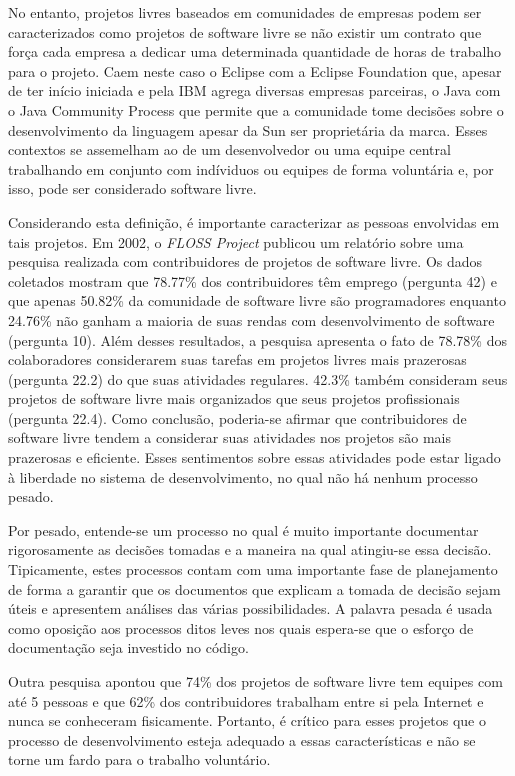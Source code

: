 No entanto, projetos livres baseados em comunidades de empresas podem
ser caracterizados como projetos de software livre se não existir um
contrato que força cada empresa a dedicar uma determinada quantidade
de horas de trabalho para o projeto. Caem neste caso o Eclipse com a
Eclipse Foundation que, apesar de ter início iniciada e pela IBM
agrega diversas empresas parceiras, o Java com o Java Community
Process que permite que a comunidade tome decisões sobre o
desenvolvimento da linguagem apesar da Sun ser proprietária da
marca. Esses contextos se assemelham ao de um desenvolvedor ou uma
equipe central trabalhando em conjunto com indíviduos ou equipes de
forma voluntária e, por isso, pode ser considerado software livre.

Considerando esta definição, é importante caracterizar as pessoas
envolvidas em tais projetos. Em 2002, o \emph{FLOSS Project}
\cite{FlossProject} publicou um relatório sobre uma pesquisa realizada
com contribuidores de projetos de software livre. Os dados coletados
\cite{FlossStats} mostram que 78.77\% dos contribuidores têm emprego
(pergunta 42) e que apenas 50.82\% da comunidade de software livre são
programadores enquanto 24.76\% não ganham a maioria de suas rendas com
desenvolvimento de software (pergunta 10). Além desses resultados, a
pesquisa apresenta o fato de 78.78\% dos colaboradores considerarem
suas tarefas em projetos livres mais prazerosas (pergunta 22.2) do que
suas atividades regulares. 42.3\% também consideram seus projetos de
software livre mais organizados que seus projetos profissionais
(pergunta 22.4). Como conclusão, poderia-se afirmar que contribuidores
de software livre tendem a considerar suas atividades nos projetos são
mais prazerosas e eficiente. Esses sentimentos sobre essas atividades
pode estar ligado à liberdade no sistema de desenvolvimento, no qual
não há nenhum processo pesado.

Por pesado, entende-se um processo no qual é muito importante
documentar rigorosamente as decisões tomadas e a maneira na qual
atingiu-se essa decisão. Tipicamente, estes processos contam com uma
importante fase de planejamento de forma a garantir que os documentos
que explicam a tomada de decisão sejam úteis e apresentem análises das
várias possibilidades. A palavra pesada é usada como oposição aos
processos ditos leves nos quais espera-se que o esforço de
documentação seja investido no código. %

Outra pesquisa \cite{Reis2003} apontou que 74\% dos projetos de
software livre tem equipes com até 5 pessoas e que 62\% dos
contribuidores trabalham entre si pela Internet e nunca se conheceram
fisicamente. Portanto, é crítico para esses projetos que o processo de
desenvolvimento esteja adequado a essas características e não se torne
um fardo para o trabalho voluntário.
